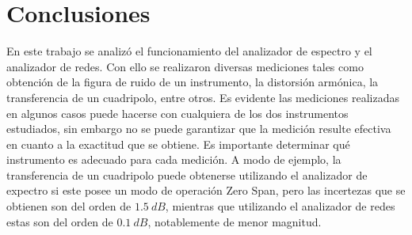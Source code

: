 \documentclass[a4paper,10pt]{article}
\begin{document}
	\section{Conclusiones}
	\indent En este trabajo se analiz\'o el funcionamiento del analizador de espectro y el analizador de redes. Con ello se realizaron diversas mediciones tales como obtenci\'on de la figura de ruido de un instrumento, la distorsi\'on arm\'onica, la transferencia de un cuadripolo, entre otros. Es evidente las mediciones realizadas en algunos casos puede hacerse con cualquiera de los dos instrumentos estudiados, sin embargo no se puede garantizar que la medici\'on resulte efectiva en cuanto a la exactitud que se obtiene. Es importante determinar qu\'e instrumento es adecuado para cada medici\'on. A modo de ejemplo, la transferencia de un cuadripolo puede obtenerse utilizando el analizador de expectro si este posee un modo de operaci\'on Zero Span, pero las incertezas que se obtienen son del orden de $1.5~dB$, mientras que utilizando el analizador de redes estas son del orden de $0.1~dB$, notablemente de menor magnitud.
\end{document}
